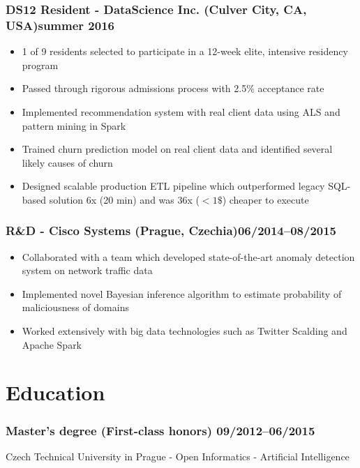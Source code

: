 \documentclass[10pt]{article}
\begin{document}
\subsubsection*{\bf DS12 Resident - DataScience Inc. (Culver City, CA, USA)\hfill summer 2016}
	 \begin{itemize}
		\setlength\itemsep{-0.25em}
		\item 1 of 9 residents selected to participate in a 12-week elite, intensive residency program
		\item Passed through rigorous admissions process with 2.5\% acceptance rate
		\item Implemented recommendation system with real client data using ALS and pattern mining in Spark
		\item Trained churn prediction model on real client data and identified several likely causes of churn
		\item Designed scalable production ETL pipeline which outperformed legacy SQL-based solution 6x (20 min) and was 36x ($< 1\$$) cheaper to execute
	 \end{itemize}

\subsubsection*{R\&D - Cisco Systems (Prague, Czechia)\hfill 06/2014--08/2015}
	 \begin{itemize}
		\setlength\itemsep{-0.25em}
		\item Collaborated with a team which developed state-of-the-art anomaly detection system on network traffic data
		\item Implemented novel Bayesian inference algorithm to estimate probability of maliciousness of domains
		\item Worked extensively with big data technologies such as Twitter Scalding and Apache Spark
	 \end{itemize}

\section*{Education}
\subsubsection*{\bf Master’s degree (First-class honors) \hfill 09/2012--06/2015}
\vspace{-1.5mm}
Czech Technical University in Prague - Open Informatics - Artificial Intelligence
\vspace{-1.5mm}
\end{document}
